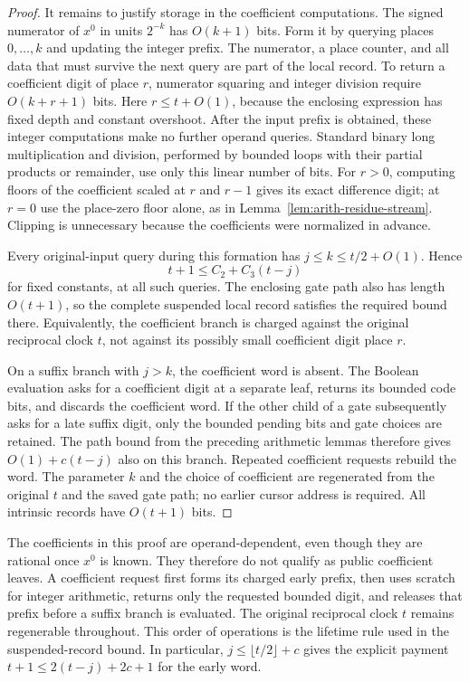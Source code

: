 \begin{proof}
It remains to justify storage in the coefficient computations.
The signed numerator of $x^0$ in units $2^{-k}$ has $O(k+1)$
bits.  Form it by querying places $0,\ldots,k$ and updating the
integer prefix.  The numerator, a place counter, and all data that
must survive the next query are part of the local record.
To return a coefficient digit of place $r$, numerator squaring and
integer division require $O(k+r+1)$ bits.  Here $r\leq t+O(1)$,
because the enclosing expression has fixed depth and constant
overshoot.  After the input prefix is obtained, these integer
computations make no further operand queries.  Standard binary
long multiplication and division, performed by bounded loops with
their partial products or remainder, use only this linear number
of bits.  For $r>0$, computing floors of the coefficient scaled at
$r$ and $r-1$ gives its exact difference digit; at $r=0$ use the
place-zero floor alone, as in Lemma~\ref{lem:arith-residue-stream}.
Clipping is unnecessary
because the coefficients were normalized in advance.

Every original-input query during this formation has
$j\leq k\leq t/2+O(1)$.  Hence
\begin{equation}
 t+1\leq C_2+C_3(t-j)
 \label{eq:arith-early-word-payment}
\end{equation}
for fixed constants, at all such queries.  The enclosing gate path
also has length $O(t+1)$, so the complete suspended local record
satisfies the required bound there.  Equivalently, the coefficient
branch is charged against the original reciprocal clock $t$, not
against its possibly small coefficient digit place $r$.

On a suffix branch with $j>k$, the coefficient word is absent.
The Boolean evaluation asks for a coefficient digit at a separate
leaf, returns its bounded code bits, and discards the coefficient
word.  If the other child of a gate subsequently asks for a late
suffix digit, only the bounded pending bits and gate choices are
retained.  The path bound from the preceding arithmetic lemmas
therefore gives $O(1)+c(t-j)$ also on this branch.  Repeated
coefficient requests rebuild the word.  The parameter $k$ and the
choice of coefficient are regenerated from the original $t$ and
the saved gate path; no earlier cursor address is required.
All intrinsic records have $O(t+1)$ bits.
\end{proof}

The coefficients in this proof are operand-dependent, even though they
are rational once $x^0$ is known.  They therefore do not qualify as
public coefficient leaves.  A coefficient request first forms its
charged early prefix, then uses scratch for integer arithmetic, returns
only the requested bounded digit, and releases that prefix before a
suffix branch is evaluated.  The original reciprocal clock $t$ remains
regenerable throughout.  This order of operations is the lifetime rule
used in the suspended-record bound.  In particular, $j\le\lfloor t/2\rfloor+c$
gives the explicit payment $t+1\le2(t-j)+2c+1$ for the early word.

